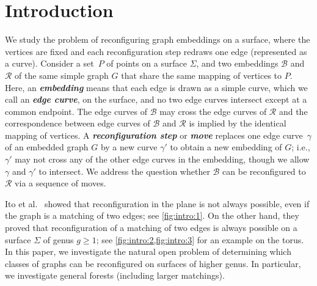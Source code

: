 \documentclass[a4paper,USenglish,cleveref,colorlinks=true,urlcolor=black,linkcolor=black,citecolor=black,thm-restate,authorcolumns]{lipics-v2021}
\theoremstyle{claimstyle}
\def\defn#1{\textit{\textbf{\boldmath #1}}}
\renewcommand{\emph}[1]{\defn{#1}}
\begin{document}
\section{Introduction}
\label{sec:intro}
We study the problem of reconfiguring graph embeddings on a surface, where the vertices are fixed and each reconfiguration step redraws one edge (represented as a curve).
Consider a set~$P$ of points on a surface $\Sigma$, and two embeddings $\mathcal{B}$ and $\mathcal{R}$ of the same simple graph $G$
that share the same mapping of vertices to $P$.
Here, an \defn{embedding} means that each edge is drawn as a simple curve, which we call an \emph{edge curve}, on the surface, and no two edge curves intersect except at a common endpoint.
The edge curves of $\mathcal{B}$ may cross the edge curves of $\mathcal{R}$ and the correspondence between edge curves of $\mathcal{B}$ and $\mathcal{R}$ is implied by the identical mapping of vertices.
A \emph{reconfiguration step} or \emph{move} replaces one edge curve~$\gamma$ of an embedded graph $G$ by a new curve $\gamma'$ to obtain a new embedding of $G$; i.e., $\gamma'$ may not cross any of the other edge curves in the embedding, though we allow $\gamma$ and $\gamma'$ to intersect.
We address the question  whether $\mathcal{B}$ can be reconfigured to~$\mathcal{R}$ via a sequence of moves.

Ito et al.~\cite{ItoIK0MNOO25} showed
that reconfiguration in the plane is not always possible, even if the graph is a matching of two
edges; see \cref{fig:intro:1}.
On the other hand, they proved that reconfiguration of a matching of two edges is always possible on a surface $\Sigma$ of genus $g \ge 1$;
see \cref{fig:intro:2,fig:intro:3} for
an example on the torus.
In this paper, we investigate the natural open problem of determining
which classes of graphs can be reconfigured on surfaces of higher genus.
In particular, we investigate general forests (including larger matchings).
\end{document}
